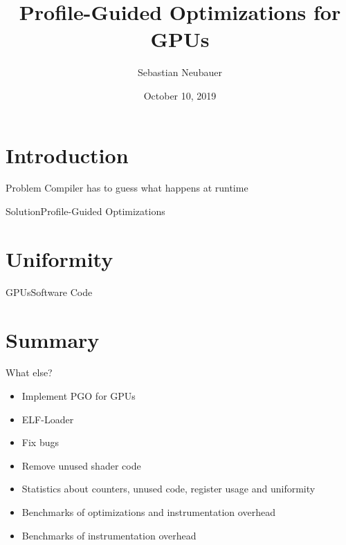 \documentclass[xcolor={usenames,dvipsnames}, aspectratio=169, 12pt]{beamer}
\title[Master Thesis]{Profile-Guided Optimizations for GPUs}
\author[S. Neubauer]{Sebastian Neubauer}
\date{October 10, 2019}
\institute{Technische Universität München}
\begin{document}
\frame[plain]{\titlepage}

\section{Introduction}

\begin{frame}{Problem}
\large Compiler has to guess what happens at runtime
\end{frame}

\begin{frame}{Solution}{Profile-Guided Optimizations}
\centering

\end{frame}

\section{Uniformity}

\begin{frame}[fragile]{GPUs}{Hardware}
\begin{center}

\end{center}

]{figures/example.frag}}
\end{frame}

\begin{frame}[fragile]{GPUs}{Software}
Code
\end{frame}

\section{Summary}

\begin{frame}{What else?}
\begin{itemize}
	\item Implement PGO for GPUs
	\item ELF-Loader
	\item Fix bugs
	\item Remove unused shader code
	\item Statistics about counters, unused code, register usage and uniformity
	\item Benchmarks of optimizations and instrumentation overhead
	\item Benchmarks of instrumentation overhead
\end{itemize}
\end{frame}
\end{document}
